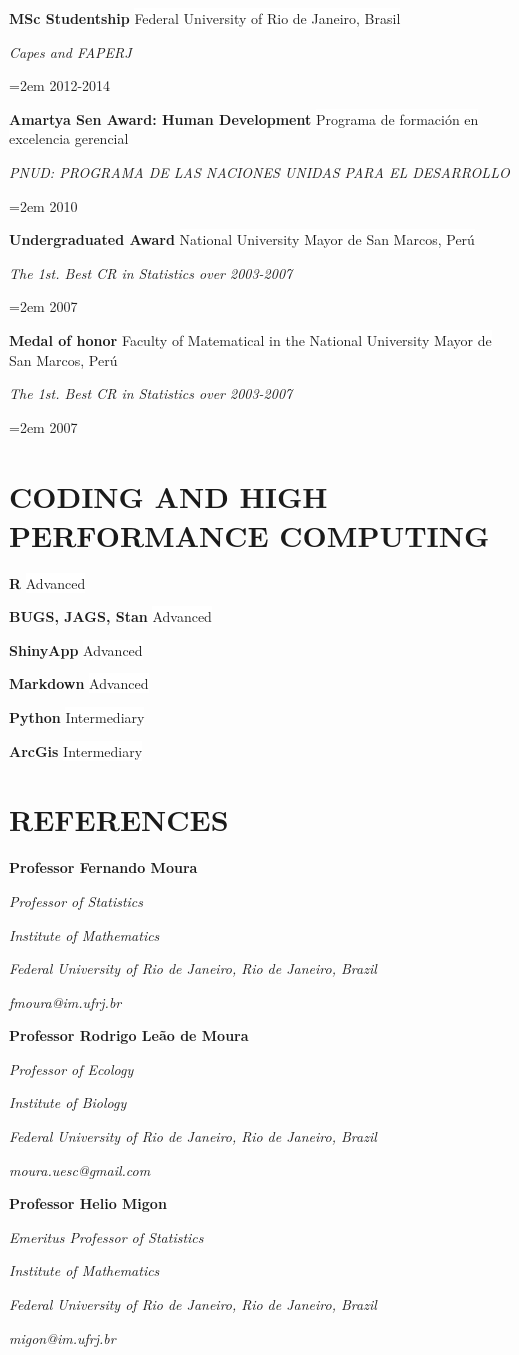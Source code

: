 \documentclass[paper=a4,fontsize=11pt]{scrartcl}	 			%
\newcommand{\sepspace}{\vspace*{1em}}			%
\newcommand{\NewPart}[1]{\section*{\uppercase{#1}}}
\newcommand{\EducationEntry}[4]{
		\noindent \textbf{#1} \hfill 					%
		\colorbox{White}{%
			\parbox{10em}{%
			\hfill\color{Black}#2}} \par				%
		\noindent \textit{#3} \par					%
		\noindent\hangindent=2em\hangafter=0 \small #4 	%
		\normalsize \par}
\newcommand{\WorkEntry}[4]{						%
		\noindent \textbf{#1} \hfill 					%
		\colorbox{White}{\color{Black}#2} \par		%
		\noindent \textit{#3} \par					%
		\noindent\hangindent=2em\hangafter=0 \small #4 	%
		\normalsize \par}
\newcommand{\RefEntry}[7]{						%
		\noindent \textbf{#1} \par 					%
		\noindent \textit{#2} \par	%
		\noindent \textit{#3} \par
		\noindent \textit{#4} \par%
		\noindent \textit{#5} \par
		\noindent \textit{#6} \par
		\noindent \textit{#7} \par}
\newcommand{\codeEntry}[2]{						%
		\noindent \textbf{#1} \hfill 					%
		\colorbox{White}{\color{Black}#2} \par		%
		}
\begin{document}
\WorkEntry{MSc Studentship}{Federal University of Rio de Janeiro, Brasil}{Capes and FAPERJ }{2012-2014}
\sepspace

\WorkEntry{Amartya Sen Award: Human Development}{Programa de formaci\'{o}n en excelencia gerencial}{PNUD: PROGRAMA DE LAS NACIONES UNIDAS PARA EL DESARROLLO}{2010}
\sepspace

\WorkEntry{Undergraduated Award}{National University Mayor de San Marcos, Per\'{u}}{The 1st. Best CR in Statistics over 2003-2007}{2007}
\sepspace

\WorkEntry{Medal of honor}{Faculty of Matematical in the National University Mayor de San Marcos, Per\'{u}}{The 1st. Best CR in Statistics over 2003-2007}{2007}
\sepspace

\NewPart{Coding and High Performance Computing}
\codeEntry{R}{Advanced}
\codeEntry{BUGS, JAGS, Stan}{Advanced}
\codeEntry{ShinyApp}{Advanced}
\codeEntry{Markdown}{Advanced}
\codeEntry{Python}{Intermediary}
\codeEntry{ArcGis}{Intermediary}




\NewPart{References}



\RefEntry{Professor Fernando Moura}
{Professor of Statistics}
{Institute of Mathematics}
{Federal University of Rio de Janeiro, Rio de Janeiro, Brazil}
{fmoura@im.ufrj.br}
{}
{}

\RefEntry{Professor Rodrigo Le\~{a}o de Moura}
{Professor of Ecology}
{Institute of Biology}
{Federal University of Rio de Janeiro, Rio de Janeiro, Brazil}
{moura.uesc@gmail.com}
{}
{}


\RefEntry{Professor Helio Migon}
{Emeritus Professor of Statistics}
{Institute of Mathematics}
{Federal University of Rio de Janeiro, Rio de Janeiro, Brazil}
{migon@im.ufrj.br}
{}
{}
\end{document}
